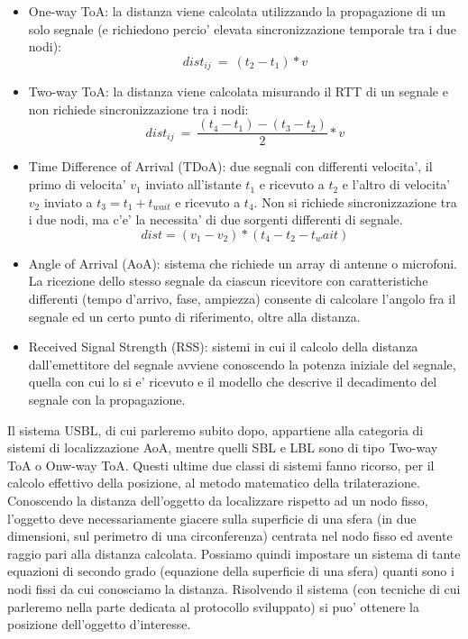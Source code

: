\begin{itemize}
    \item One-way ToA: la distanza viene calcolata utilizzando la propagazione di un solo segnale (e richiedono percio' elevata sincronizzazione temporale tra i due nodi):
    \[dist_{ij}\ =\ (t_2-t_1)*v\]
    \item Two-way ToA: la distanza viene calcolata misurando il RTT di un segnale e non richiede sincronizzazione tra i nodi:
    \[dist_{ij}\ =\ \frac{(t_4-t_1)-(t_3-t_2)}{2}*v\]
    \item Time Difference of Arrival (TDoA): due segnali con differenti velocita', il primo di velocita' $v_1$ inviato all'istante $t_1$ e ricevuto a $t_2$ e l'altro di velocita' $v_2$ inviato a $t_3 = t_1 + t_{wait}$ e ricevuto a $t_4$. Non si richiede sincronizzazione tra i due nodi, ma c'e' la necessita' di due sorgenti differenti di segnale.
    \[dist = (v_1 - v_2)*(t_4 - t_2 - t_wait)\]
    \item Angle of Arrival (AoA): sistema che richiede un array di antenne o microfoni. La ricezione dello stesso segnale da ciascun ricevitore con caratteristiche differenti (tempo d'arrivo, fase, ampiezza) consente di calcolare l'angolo fra il segnale ed un certo punto di riferimento, oltre alla distanza.
    \item Received Signal Strength (RSS): sistemi in cui il calcolo della distanza dall'emettitore del segnale avviene conoscendo la potenza iniziale del segnale, quella con cui lo si e' ricevuto e il modello che descrive il decadimento del segnale con la propagazione.
\end{itemize}
Il sistema USBL, di cui parleremo subito dopo, appartiene alla categoria di sistemi di localizzazione AoA, mentre quelli SBL e LBL sono di tipo Two-way ToA o Onw-way ToA.
Questi ultime due classi di sistemi fanno ricorso, per il calcolo effettivo della posizione, al metodo matematico della trilaterazione.
Conoscendo la distanza dell'oggetto da localizzare rispetto ad un nodo fisso, l'oggetto deve necessariamente giacere sulla superficie di una sfera (in due dimensioni, sul perimetro di una circonferenza) centrata nel nodo fisso ed avente raggio pari alla distanza calcolata. Possiamo quindi impostare un sistema di tante equazioni di secondo grado (equazione della superficie di una sfera) quanti sono i nodi fissi da cui conosciamo la distanza. Risolvendo il sistema (con tecniche di cui parleremo nella parte dedicata al protocollo sviluppato) si puo' ottenere la posizione dell'oggetto d'interesse.

